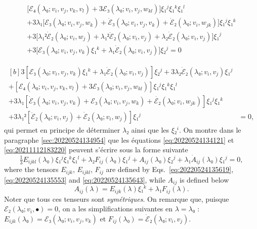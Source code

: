 \documentclass[12pt, final]{scrartcl}
\theoremstyle{definition}
\begin{document}
\begin{multline*}
  \bigl[ℰ₄(λ₀; v_i, v_j, v_k, v_l) + 3ℰ₃(λ₀; v_i, v_j, w_{kl})\bigr] ξ₁^j ξ₁^k ξ₁^l\\
  + 3λ₁ \bigl[ℰ₃(λ₀; v_i, v_j, w_k) + \dot{ℰ}₃(λ₀; v_i, v_j, v_k) + \dot{ℰ}₂(λ₀; v_i, w_{jk}) \bigr] ξ₁^j ξ₁^k\\
  + 3\bigl[λ₁² \dot{ℰ}₂(λ₀; v_i, w_j) + λ₁² \ddot{ℰ}₂(λ₀; v_i, v_j) + λ₂ \dot{ℰ}₂(λ₀; v_i, v_j)\bigr] ξ₁^j\\
   + 3\bigl[ℰ₃(λ₀; v_i, v_j, v_k) ξ₁^k + λ₁ \dot{ℰ}₂(λ₀; v_i, v_j)\bigr] ξ₂^j = 0
\end{multline*}

\begin{equation}
  \label{eq:20211112183220}
  \begin{aligned}[b]
    3[ℰ₃(λ₀; v_i, v_j, v_k) ξ₁^k + λ₁ \dot{ℰ}₂(λ₀; v_i, v_j)] ξ₂^j + 3λ₂ \dot{ℰ}₂(λ₀; v_i, v_j) ξ₁^j &\\
    + [ℰ₄(λ₀; v_i, v_j, v_k, v_l) + 3ℰ₃(λ₀; v_i, v_j, w_{kl})] ξ₁^j ξ₁^k ξ₁^l &\\
    + 3λ₁ [\dot{ℰ}₃(λ₀; v_i, v_j, v_k) + ℰ₃(λ₀; v_i, v_j, w_k) + \dot{ℰ₂}(λ₀; v_i, w_{jk})] ξ₁^j ξ₁^k&\\
    + 3λ₁² [\ddot{ℰ}₂(λ₀; v_i, v_j) + \dot{ℰ}₂(λ₀ ; v_i, w_j)] ξ₁^j &= 0,
  \end{aligned}
\end{equation}
qui permet en principe de déterminer \(λ₂\) ainsi que les \(ξ₂^i\). On montre
dans le paragraphe \ref{sec:20220524134954} que les équations
\eqref{eq:20220524134121} et \eqref{eq:20211112183220} peuvent s'écrire sous la
forme suivante
\begin{equation}
  \label{eq:20220601070917}
  \tfrac{1}{3} E_{ijkl}(λ₀) ξ₁^j ξ₁^k ξ₁^l + λ₂ F_{ij}(λ₀) ξ₁^j + A_{ij}(λ₀) ξ₂^j + λ₁ \dot{A}_{ij}(λ₀) ξ₁^j = 0,
\end{equation}
where the tensors \(E_{i j k}\), \(E_{i j k l}\), \(F_{i j}\) are defined by
Eqs.~\eqref{eq:20220524135619}, \eqref{eq:20220524135553} and
\eqref{eq:20220524135643}, while \(A_{ij}\) is defined below
\begin{equation}
  \label{eq:20220524135705}
  A_{ij}(λ) = E_{ijk}(λ) ξ₁^k + λ₁ F_{ij}(λ) .
\end{equation}
Noter que tous ces tenseurs sont \emph{symétriques}. On remarque que, puisque
\(ℰ₂(λ₀ ; v_i, •) = 0\), on a les simplifications suivantes en \(λ = λ₀\) :
\(E_{ijk}(λ₀) = ℰ₃(λ₀; v_i, v_j, v_k)\) et
\(F_{ij}(λ₀) = \dot{ℰ}₂(λ₀; v_i, v_j)\).
\end{document}
